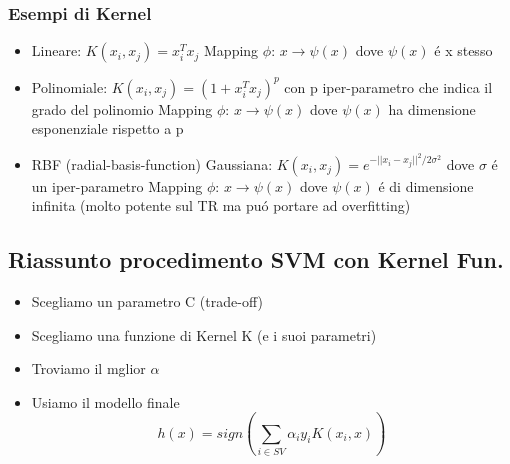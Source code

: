 \documentclass{article}
\begin{document}
\subsubsection{Esempi di Kernel}
\begin{itemize}
    \item Lineare: $K(x_i,x_j)=x_i^Tx_j$ \newline
        Mapping $\phi$: $x \rightarrow \psi(x)$ dove $\psi(x)$ é x stesso
    \item Polinomiale: $K(x_i,x_j)=(1+x_i^Tx_j)^p$ con p iper-parametro che indica il grado del polinomio \newline
        Mapping $\phi$: $x \rightarrow \psi(x)$ dove $\psi(x)$ ha dimensione esponenziale rispetto a p
    \item RBF (radial-basis-function) Gaussiana: $K(x_i,x_j)=e^{-||x_i-x_j||^2/2\sigma^2}$ dove $\sigma$ é un iper-parametro\newline
        Mapping $\phi$: $x \rightarrow \psi(x)$ dove $\psi(x)$ é di dimensione infinita \newline
        (molto potente sul TR ma puó portare ad overfitting)
\end{itemize}

\subsection{Riassunto procedimento SVM con Kernel Fun.}
\begin{itemize}
    \item Scegliamo un parametro C (trade-off)
    \item Scegliamo una funzione di Kernel K (e i suoi parametri)
    \item Troviamo il mglior $\alpha$
    \item Usiamo il modello finale \[h(x)=sign(\sum_{i\in SV} \alpha_iy_iK(x_i,x))\]
\end{itemize}
\end{document}
